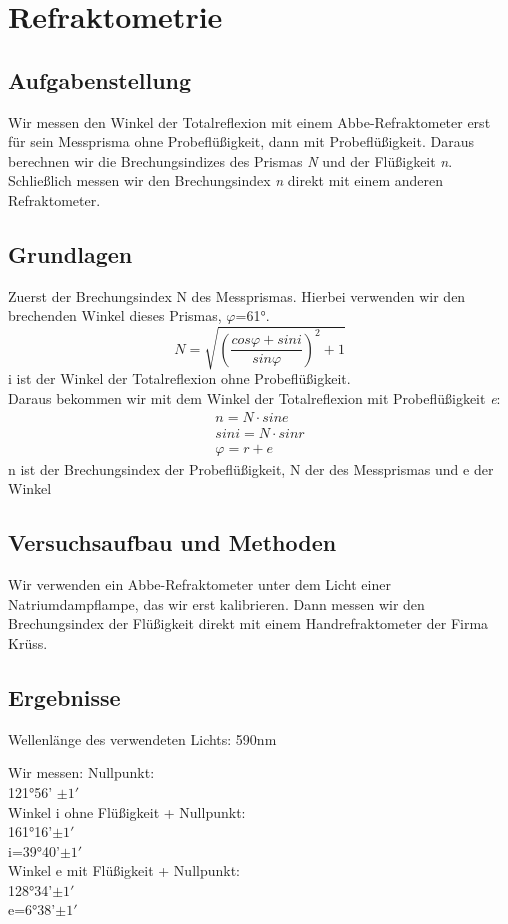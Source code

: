 \documentclass{article}
\begin{document}
\section{Refraktometrie}

\subsection{Aufgabenstellung}
Wir messen den Winkel der Totalreflexion mit einem Abbe-Refraktometer erst für sein Messprisma ohne Probeflüßigkeit, dann mit Probeflüßigkeit. Daraus berechnen wir die Brechungsindizes des Prismas \textit{N} und der Flüßigkeit \textit{n}. Schließlich messen wir den Brechungsindex \textit{n} direkt mit einem anderen Refraktometer. 
\subsection{Grundlagen}
Zuerst der Brechungsindex N des Messprismas. Hierbei verwenden wir den brechenden Winkel dieses Prismas, $\varphi$=61°.
\begin{equation}
\label{NMessprisma}
N=\sqrt{(\frac{cos\varphi + sin i}{sin \varphi})^2+1}
\end{equation}
i ist der Winkel der Totalreflexion ohne Probeflüßigkeit. \\
Daraus bekommen wir mit dem Winkel der Totalreflexion mit Probeflüßigkeit \textit{e}:
\begin{align}
\label{ns}
n=N \cdot sin e \\
sin i= N \cdot sin r \\
\varphi = r + e
\end{align}
n ist der Brechungsindex der Probeflüßigkeit, N der des Messprismas und e der Winkel 
\subsection{Versuchsaufbau und Methoden}
Wir verwenden ein Abbe-Refraktometer unter dem Licht einer Natriumdampflampe, das wir erst kalibrieren. Dann messen wir den Brechungsindex der Flüßigkeit direkt mit einem Handrefraktometer der Firma Krüss.
\subsection{Ergebnisse}
Wellenlänge des verwendeten Lichts: 590nm

Wir messen:
Nullpunkt:\\
121°56' $\pm 1'$\\
Winkel i ohne Flüßigkeit + Nullpunkt:\\
161°16'$\pm 1'$\\
i=39°40'$\pm 1'$\\
Winkel e mit Flüßigkeit + Nullpunkt:\\
128°34'$\pm 1'$\\
e=6°38'$\pm 1'$\\
\end{document}
